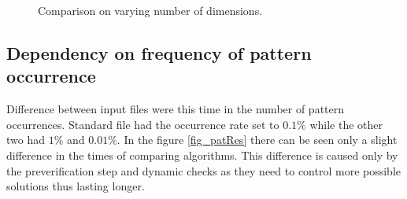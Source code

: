 \begin{figure}
\begin{minipage}{.5\linewidth}
\centering
{}
\end{minipage}%
\begin{minipage}{.5\linewidth}
\centering
{}
\end{minipage}\par\medskip

\caption{Comparison on varying number of dimensions.}
\label{fig_dimRes}
\end{figure}

\subsection{Dependency on frequency of pattern occurrence}
Difference between input files were this time in the number of pattern occurrences. Standard file had the occurrence rate set to $0.1 \%$ while the other two had $1 \%$ and $0.01 \%$. In the figure \ref{fig_patRes} there can be seen only a slight difference in the times of comparing algorithms. This difference is caused only by the preverification step and dynamic checks as they need to control more possible solutions thus lasting longer.

